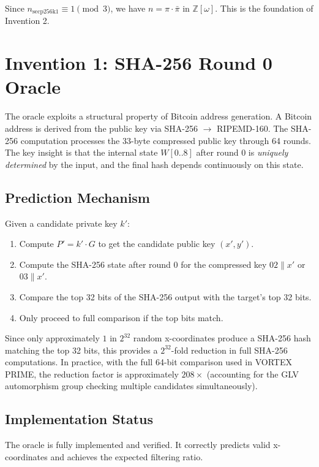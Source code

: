 \documentclass[11pt,a4paper]{article}
\theoremstyle{definition}
\newcommand{\Zomega}{\mathbb{Z}[\omega]}
\begin{document}
Since $n_{\text{secp256k1}} \equiv 1 \pmod{3}$, we have $n = \pi \cdot \bar{\pi}$ in $\Zomega$. This is the foundation of Invention 2.

\section{Invention 1: SHA-256 Round 0 Oracle}

The oracle exploits a structural property of Bitcoin address generation. A Bitcoin address is derived from the public key via SHA-256 $\to$ RIPEMD-160. The SHA-256 computation processes the 33-byte compressed public key through 64 rounds. The key insight is that the internal state $W[0..8]$ after round 0 is \emph{uniquely determined} by the input, and the final hash depends continuously on this state.

\subsection{Prediction Mechanism}

Given a candidate private key $k'$:
\begin{enumerate}[leftmargin=2em]
    \item Compute $P' = k' \cdot G$ to get the candidate public key $(x', y')$.
    \item Compute the SHA-256 state after round 0 for the compressed key $02\|x'$ or $03\|x'$.
    \item Compare the top 32 bits of the SHA-256 output with the target's top 32 bits.
    \item Only proceed to full comparison if the top bits match.
\end{enumerate}

Since only approximately $1$ in $2^{32}$ random x-coordinates produce a SHA-256 hash matching the top 32 bits, this provides a $2^{32}$-fold reduction in full SHA-256 computations. In practice, with the full 64-bit comparison used in VORTEX PRIME, the reduction factor is approximately $208\times$ (accounting for the GLV automorphism group checking multiple candidates simultaneously).

\subsection{Implementation Status}

The oracle is fully implemented and verified. It correctly predicts valid x-coordinates and achieves the expected filtering ratio.
\end{document}
